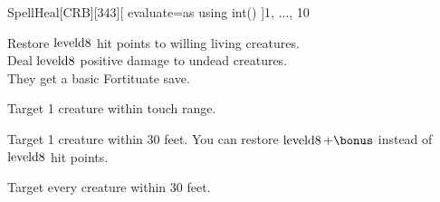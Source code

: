 
\begin{card-collection}{Spell}{\level}{Heal}[CRB][343]{\level}[
  evaluate=\level as \bonus using int()
]{1, ..., 10}



Restore \(\operatorname{level d8}\) hit points to willing living creatures.\\
Deal \(\operatorname{level d8}\) positive damage to undead creatures.\\
They get a basic Fortituate save.


Target 1 creature within touch range.


Target 1 creature within 30 feet.
You can restore \(\operatorname{\level d8}+\bonus\) instead of \(\operatorname{level d8}\) hit points.



Target every creature within 30 feet.
\end{card-collection}%